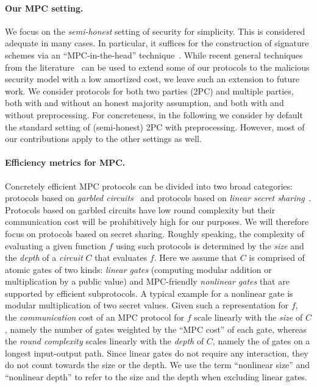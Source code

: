 \paragraph{Our MPC setting.} We focus on the {\em semi-honest} setting of security for simplicity. This is considered adequate in many cases. In particular, it suffices for the construction of signature
schemes via an ``MPC-in-the-head'' technique~\cite{ishai2007-zkmpc,chase2017-picnic}.
While recent general techniques from the literature~\cite{BBCGI19,BGIN19} can be used to extend some of our protocols to the malicious security model with a low amortized cost, we leave such an extension to future work. We consider protocols for both two parties (2PC) and multiple parties, both with and without an honest majority assumption, and both with and without preprocessing. For concreteness, in the following we consider by default the standard setting of (semi-honest) 2PC with preprocessing. However, most of our contributions apply to the other settings as well. 

\paragraph{Efficiency metrics for MPC.}   Concretely efficient MPC protocols can be divided into two broad categories: protocols based on {\em garbled circuits}~\cite{Yao} and protocols based on {\em linear secret sharing}~\cite{GMW,BGW,CCD}. Protocols based on garbled circuits have low round complexity but their communication cost will be prohibitively high for our purposes. We will therefore focus on protocols based on secret sharing. Roughly speaking, the complexity of evaluating  a given function $f$ using such protocols is determined by the {\em size} and the {\em depth} of a {\em circuit} $C$ that evaluates $f$.  Here we assume that $C$ is comprised of atomic gates of two kinds: {\em linear gates} (computing modular addition or multiplication by a public value) and MPC-friendly {\em nonlinear gates}  that are supported by efficient subprotocols. A typical example for a nonlinear gate is modular multiplication of two secret values. Given such a representation for $f$, the {\em communication} cost of an MPC protocol for $f$ scale linearly with the {\em size} of $C$, namely the number of gates weighted by the ``MPC cost'' of each gate, whereas the {\em round complexity} scales linearly with the {\em depth} of $C$, namely the of gates on a longest input-output path. Since linear gates do not require any interaction, they do not count towards the size or the depth. We use the term ``nonlinear size'' and ``nonlinear depth'' to refer to the size and the depth when excluding linear gates. 

